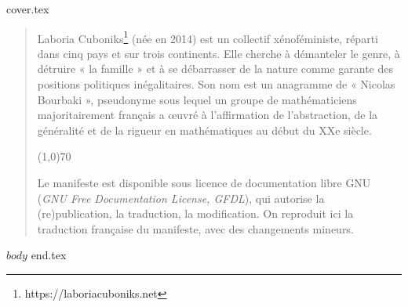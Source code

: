 \documentclass[12pt]{book}
\begin{document}
{cover.tex}
\clearpage
\begin{quote}
\singlespacing
{\footnotesize Laboria Cuboniks\footnote{\selectfont https://laboriacuboniks.net} (née en 2014) est un collectif xénoféministe, réparti dans cinq pays et sur trois continents. Elle cherche à démanteler le genre, à détruire « la famille » et à se débarrasser de la nature comme garante des positions politiques inégalitaires. Son nom est un anagramme de « Nicolas Bourbaki », pseudonyme sous lequel un groupe de mathématiciens majoritairement français a œuvré à l'affirmation de l'abstraction, de la généralité et de la rigueur en mathématiques au début du XXe siècle.}
\begin{center}
\line(1,0){70}
\end{center}
{\footnotesize Le manifeste est disponible sous licence de documentation libre GNU (\textit{GNU Free Documentation License, GFDL}), qui autorise la (re)publication, la traduction, la modification. On reproduit ici la traduction française du manifeste, avec des changements mineurs. }
\clearpage
\end{quote}

\onehalfspacing %

$body$
\newpage
{end.tex}
\end{document}
